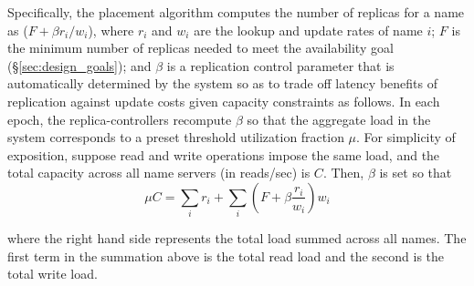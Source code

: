 {
	
	
	Specifically, the placement algorithm computes the number of replicas for a name as ($F+ \beta r_i/w_i$), where $r_i$ and $w_i$ are the lookup and update rates of name $i$; $F$ is the minimum number of replicas needed to meet the availability goal (\S \ref{sec:design_goals}); and $\beta$ is a replication control parameter that is automatically determined by the system so as to trade off latency benefits of replication against update costs given capacity constraints as follows. In each epoch, the replica-controllers recompute $\beta$ so that the aggregate load in the system corresponds to a preset threshold utilization fraction $\mu$. For simplicity of exposition, suppose read and write operations impose the same load, and the total capacity across all name servers (in reads/sec) is $C$. Then, $\beta$ is set so that  
	\vsp
	\begin{equation}
	\mu C = \sum_i r_i  + \sum_i (F + \beta  \frac{r_i}{w_i}) w_i
	\label{eq:mu}
	\end{equation}
	\vsp
	\vsp
	
	where the right hand side represents the total load summed across all names. The first term in the summation above is the total read load and the second is the total write load. 
	
}
